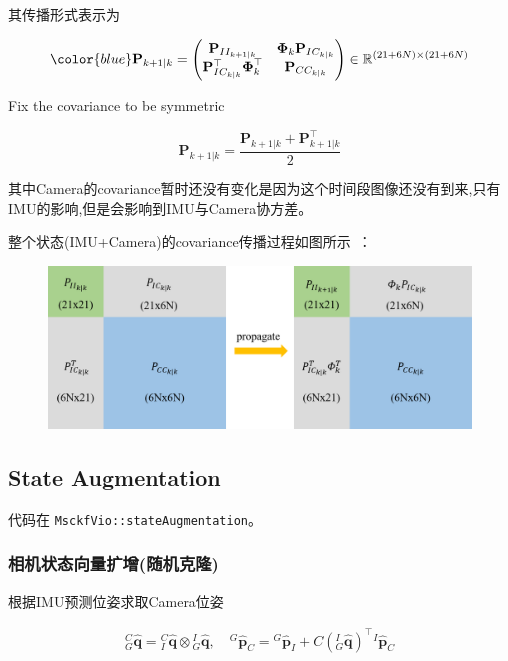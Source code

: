 \documentclass[12pt,a4paper]{article}
\begin{document}
其传播形式表示为

\begin{equation}
{\color{blue}
\mathbf{P}_{k+1|k} = 
\begin{pmatrix}
\mathbf{P}_{II_{k+1|k}} & \boldsymbol{\Phi}_k \mathbf{P}_{IC_{k|k}} \\
\mathbf{P}_{IC_{k|k}}^\top \boldsymbol{\Phi}_k^\top & \mathbf{P}_{CC_{k|k}}
\end{pmatrix}
\in \mathbb{R}^{(21+6N) \times (21+6N)}
}
\end{equation}

Fix the covariance to be symmetric

\begin{equation}
\mathbf{P}_{k+1|k} = \frac{\mathbf{P}_{k+1|k} + \mathbf{P}_{k+1|k}^{\top}}{2}
\end{equation}

其中Camera的covariance暂时还没有变化是因为这个时间段图像还没有到来,只有IMU的影响,但是会影响到IMU与Camera协方差。

整个状态(IMU+Camera)的covariance传播过程如图所示~\cite{xinliang-zhong-msckf_notes}：

\begin{figure}[H]
\centering
\includegraphics[scale=0.4]{images/imu_propagate.png}
\end{figure}

\subsection{State Augmentation}

代码在 \verb|MsckfVio::stateAugmentation|。

\subsubsection{相机状态向量扩增(随机克隆)}

根据IMU预测位姿求取Camera位姿

\begin{equation}
\begin{aligned}
{}^C_G\hat{\mathbf{q}} = {}^C_I\hat{\mathbf{q}} \otimes {}^I_G\hat{\mathbf{q}}, \quad
{}^G\hat{\mathbf{p}}_C = {}^G\hat{\mathbf{p}}_I + C\left({}^I_G\hat{\mathbf{q}}\right)^\top {}^I\hat{\mathbf{p}}_C
\end{aligned}
\end{equation}
\end{document}
